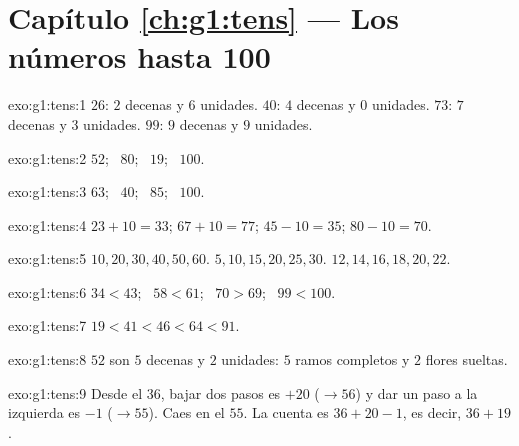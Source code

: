 \section*{Capítulo \ref{ch:g1:tens} --- Los números hasta 100}

\begin{solution}{exo:g1:tens:1}
$26$: $2$ decenas y $6$ unidades. $40$: $4$ decenas y $0$ unidades. $73$: $7$
decenas y $3$ unidades. $99$: $9$ decenas y $9$ unidades.
\end{solution}

\begin{solution}{exo:g1:tens:2}
$52$; \ $80$; \ $19$; \ $100$.
\end{solution}

\begin{solution}{exo:g1:tens:3}
$63$; \ $40$; \ $85$; \ $100$.
\end{solution}

\begin{solution}{exo:g1:tens:4}
$23 + 10 = 33$; \quad $67 + 10 = 77$; \quad $45 - 10 = 35$; \quad
$80 - 10 = 70$.
\end{solution}

\begin{solution}{exo:g1:tens:5}
$10, 20, 30, 40, 50, 60$. \quad $5, 10, 15, 20, 25, 30$. \quad
$12, 14, 16, 18, 20, 22$.
\end{solution}

\begin{solution}{exo:g1:tens:6}
$34 < 43$; \ $58 < 61$; \ $70 > 69$; \ $99 < 100$.
\end{solution}

\begin{solution}{exo:g1:tens:7}
$19 < 41 < 46 < 64 < 91$.
\end{solution}

\begin{solution}{exo:g1:tens:8}
$52$ son $5$ decenas y $2$ unidades: $5$ ramos completos y $2$ flores
sueltas.
\end{solution}

\begin{solution}{exo:g1:tens:9}
Desde el $36$, bajar dos pasos es $+20$ ($\to 56$) y dar un paso a la izquierda es
$-1$ ($\to 55$). Caes en el $55$. La cuenta es
$36 + 20 - 1$, es decir, $36 + 19$.
\end{solution}
